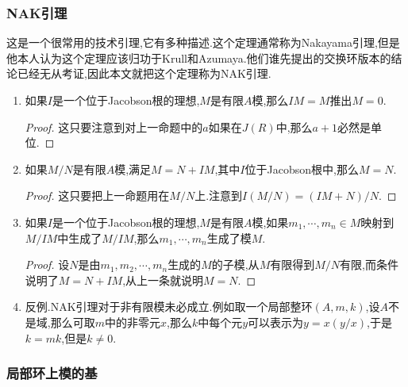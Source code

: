 \subsubsection{NAK引理}

这是一个很常用的技术引理,它有多种描述.这个定理通常称为Nakayama引理,但是他本人认为这个定理应该归功于Krull和Azumaya.他们谁先提出的交换环版本的结论已经无从考证,因此本文就把这个定理称为NAK引理.
\begin{enumerate}
	\item 如果$I$是一个位于Jacobson根的理想,$M$是有限$A$模,那么$IM=M$推出$M=0$.
	\begin{proof}
		
		这只要注意到对上一命题中的$a$如果在$J(R)$中,那么$a+1$必然是单位.
	\end{proof}
	\item 如果$M/N$是有限$A$模,满足$M=N+IM$,其中$I$位于Jacobson根中,那么$M=N$.
	\begin{proof}
		
		这只要把上一命题用在$M/N$上.注意到$I(M/N)=(IM+N)/N$.
	\end{proof}
	\item 如果$I$是一个位于Jacobson根的理想,$M$是有限$A$模,如果$m_1,\cdots,m_n\in M$映射到$M/IM$中生成了$M/IM$,那么$m_1,\cdots,m_n$生成了模$M$.
	\begin{proof}
		
		设$N$是由$m_1,m_2,\cdots,m_n$生成的$M$的子模,从$M$有限得到$M/N$有限,而条件说明了$M=N+IM$,从上一条就说明$M=N$.
	\end{proof}
    \item 反例.NAK引理对于非有限模未必成立.例如取一个局部整环$(A,m,k)$,设$A$不是域,那么可取$m$中的非零元$x$,那么$k$中每个元$y$可以表示为$y=x(y/x)$,于是$k=mk$,但是$k\not=0$.
\end{enumerate}
\subsubsection{局部环上模的基}


